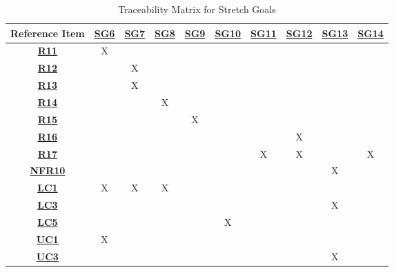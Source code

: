 \begin{table}[ht]
\centering
\begin{tabular}{|c|c|c|c|c|c|c|c|c|c|}
\hline
\textbf{Reference Item} &
\hyperref[G_local_multiplayer]{\textbf{SG6}} &
\hyperref[G_singleplayer]{\textbf{SG7}} &
\hyperref[G_matchmaking]{\textbf{SG8}} &
\hyperref[G_saving]{\textbf{SG9}} &
\hyperref[G_customization2]{\textbf{SG10}} &
\hyperref[G_skins]{\textbf{SG11}} &
\hyperref[G_stats]{\textbf{SG12}} &
\hyperref[G_platforms]{\textbf{SG13}} &
\hyperref[G_highlights]{\textbf{SG14}} \\ \hline
\hyperref[R11]{\textbf{R11}} &X & & & & & & & & \\ \hline
\hyperref[R12]{\textbf{R12}} & &X & & & & & & & \\ \hline
\hyperref[R13]{\textbf{R13}} & &X & & & & & & & \\ \hline
\hyperref[R14]{\textbf{R14}} & & &X & & & & & & \\ \hline
\hyperref[R15]{\textbf{R15}} & & & &X & & & & & \\ \hline
\hyperref[R16]{\textbf{R16}} & & & & & & &X & & \\ \hline
\hyperref[R17]{\textbf{R17}} & & & & & &X &X & &X \\ \hline
\hyperref[NFR10]{\textbf{NFR10}} & & & & & & & &X & \\ \hline
\hyperref[LC_find_opp]{\textbf{LC1}} &X &X &X & & & & & & \\ \hline
\hyperref[LC_platforms]{\textbf{LC3}} & & & & & & & &X & \\ \hline
\hyperref[LC_num_players]{\textbf{LC5}} & & & & &X & & & & \\ \hline
\hyperref[ULC_multiplayer]{\textbf{UC1}} &X & & & & & & & & \\ \hline
\hyperref[ULC_godot]{\textbf{UC3}} & & & & & & & &X & \\ \hline
\end{tabular}
\caption{Traceability Matrix for Stretch Goals}
\label{table:stretch_goals_traceability}
\end{table}